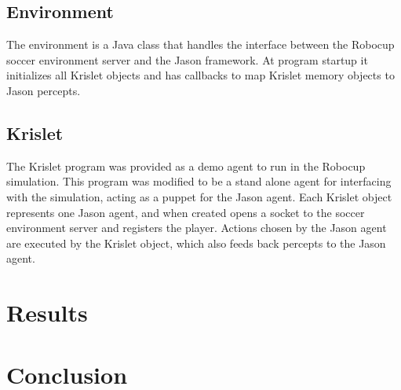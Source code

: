 \documentclass[conference]{IEEEtran}
\begin{document}
\subsection{Environment}
The environment is a Java class that handles the interface between the Robocup soccer environment server and the Jason framework. At program startup it initializes all Krislet objects and has callbacks to map Krislet memory objects to Jason percepts. 

\subsection{Krislet}
The Krislet program was provided as a demo agent to run in the Robocup simulation. This program was modified to be a stand alone agent for interfacing with the simulation, acting as a puppet for the Jason agent. Each Krislet object represents one Jason agent, and when created opens a socket to the soccer environment server and registers the player. Actions chosen by the Jason agent are executed by the Krislet object, which also feeds back percepts to the Jason agent.



\section{Results}

\section{Conclusion}
\end{document}
